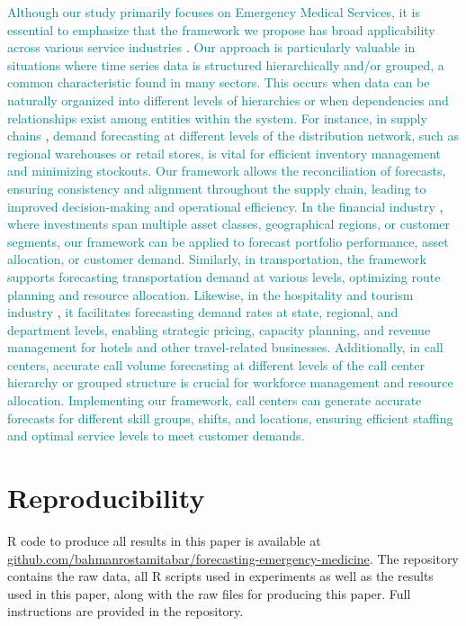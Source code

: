 \documentclass[
  authoryear,
  preprint,
  3p]{elsarticle}
\begin{document}
\textcolor{teal}{Although our study primarily focuses on Emergency Medical Services, it is essential to emphasize that the framework we propose has broad applicability across various service industries}
\citep{ostrom2010moving}.
\textcolor{teal}{Our approach is particularly valuable in situations where time series data is structured hierarchically and/or grouped, a common characteristic found in many sectors. This occurs when data can be naturally organized into different levels of hierarchies or when dependencies and relationships exist among entities within the system. For instance, in supply chains}
\citep{shugan2000advance},
\textcolor{teal}{demand forecasting at different levels of the distribution network, such as regional warehouses or retail stores, is vital for efficient inventory management and minimizing stockouts. Our framework allows the reconciliation of forecasts, ensuring consistency and alignment throughout the supply chain, leading to improved decision-making and operational efficiency. In the financial industry}
\citep{kimes1998strategic},
\textcolor{teal}{where investments span multiple asset classes, geographical regions, or customer segments, our framework can be applied to forecast portfolio performance, asset allocation, or customer demand. Similarly, in transportation, the framework supports forecasting transportation demand at various levels, optimizing route planning and resource allocation. Likewise, in the hospitality and tourism industry}
\citep{dekimpe2016impact},
\textcolor{teal}{it facilitates forecasting demand rates at state, regional, and department levels, enabling strategic pricing, capacity planning, and revenue management for hotels and other travel-related businesses. Additionally, in call centers, accurate call volume forecasting at different levels of the call center hierarchy or grouped structure is crucial for workforce management and resource allocation. Implementing our framework, call centers can generate accurate forecasts for different skill groups, shifts, and locations, ensuring efficient staffing and optimal service levels to meet customer demands.}

\hypertarget{reproducibility}{%
\section*{Reproducibility}\label{reproducibility}}

R code to produce all results in this paper is available at
\href{https://github.com/bahmanrostamitabar/forecasting-emergency-medicine}{github.com/bahmanrostamitabar/forecasting-emergency-medicine}.
The repository contains the raw data, all R scripts used in experiments
as well as the results used in this paper, along with the raw files for
producing this paper. Full instructions are provided in the repository.


\renewcommand\refname{References}
  
\end{document}

